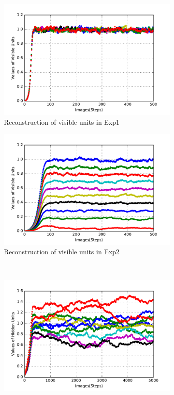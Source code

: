 \begin{figure}
\begin{subfigure}[t]{0.4\textwidth}
		\includegraphics[width=\textwidth]{pics_sdlm/30_exp_RBM/exp1_recon_non.pdf}
		\caption{Reconstruction of visible units in Exp1}
	\end{subfigure}
	\begin{subfigure}[t]{0.4\textwidth}
		\includegraphics[width=\textwidth]{pics_sdlm/30_exp_RBM/exp2_recon_non.pdf}
		\caption{Reconstruction of visible units in Exp2}
	\end{subfigure}\\
	\begin{subfigure}[t]{0.4\textwidth}
		\includegraphics[width=\textwidth]{pics_sdlm/30_exp_RBM/exp1_hid_non.pdf}

\end{subfigure}
\end{figure}
